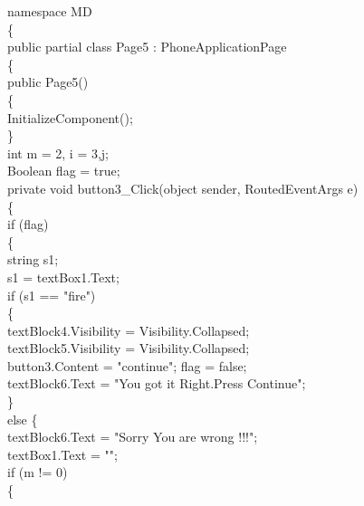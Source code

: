 {{namespace MD\\
\{\\
    public partial class Page5 : PhoneApplicationPage\\
    \{\\
        public Page5()\\
        \{\\
            InitializeComponent();\\
        \}\\
        int m = 2, i = 3,j;\\
          
        Boolean flag = true;\\
        private void button3_Click(object sender, RoutedEventArgs e)\\
        \{\\
            if (flag)\\
            \{\\
                string s1;\\
                s1 = textBox1.Text;\\
                if (s1 == "fire")\\
                \{\\
                    textBlock4.Visibility = Visibility.Collapsed;\\
                    textBlock5.Visibility = Visibility.Collapsed;\\
                    button3.Content = "continue"; flag = false;\\
                    textBlock6.Text = "You got it Right.Press Continue";\\
                \}\\
                else
                \{\\
                    textBlock6.Text = "Sorry You are wrong !!!";\\
                    textBox1.Text = "";\\
                    if (m != 0)\\
                    \{\\

}}

